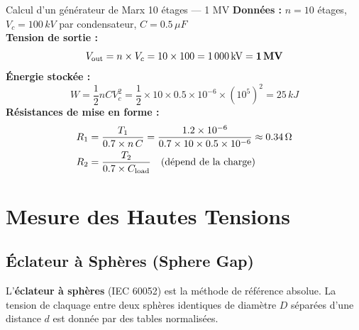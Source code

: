 \documentclass[12pt, a4paper, twoside]{report}
\begin{document}
\begin{exemple}{Calcul d'un générateur de Marx 10 étages — 1 MV}
\textbf{Données :} $n = 10$ étages, $V_c = 100\,\si{kV}$ par condensateur, $C = 0.5\,\si{\mu F}$\\[6pt]
\textbf{Tension de sortie :}
\[ V_{\rm out} = n \times V_c = 10 \times 100 = 1\,000\,\si{kV} = \mathbf{1\,MV} \]
\textbf{Énergie stockée :}
\[ W = \frac{1}{2} n C V_c^2 = \frac{1}{2}\times10\times0.5\times10^{-6}\times(10^5)^2 = 25\,\si{kJ} \]
\textbf{Résistances de mise en forme :}
\begin{align*}
  R_1 &= \frac{T_1}{0.7 \times n\,C} = \frac{1.2\times10^{-6}}{0.7\times10\times0.5\times10^{-6}} \approx 0.34\,\Omega \\
  R_2 &= \frac{T_2}{0.7 \times C_{\rm load}} \quad \text{(dépend de la charge)}
\end{align*}
\end{exemple}

\chapter{Mesure des Hautes Tensions}

\section{Éclateur à Sphères (Sphere Gap)}

L'\textbf{éclateur à sphères} (IEC 60052) est la méthode de référence absolue.
La tension de claquage entre deux sphères identiques de diamètre $D$ séparées d'une
distance $d$ est donnée par des tables normalisées.
\end{document}
